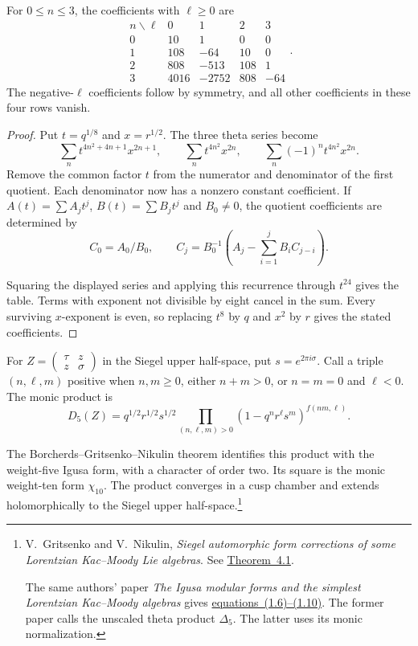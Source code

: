 \begin{proposition}\label{mht:prop:compact-jacobi-coefficients}
For \(0\leq n\leq3\), the coefficients with \(\ell\geq0\) are
\[
 \begin{array}{c|rrrr}
 n\backslash\ell&0&1&2&3\\ \hline
 0&10&1&0&0\\
 1&108&-64&10&0\\
 2&808&-513&108&1\\
 3&4016&-2752&808&-64
 \end{array}.
\]
The negative-\(\ell\) coefficients follow by symmetry, and all
other coefficients in these four rows vanish.
\end{proposition}
\begin{proof}
Put \(t=q^{1/8}\) and \(x=r^{1/2}\).
The three theta series become
\[
 \sum_n t^{4n^2+4n+1}x^{2n+1},\qquad
 \sum_n t^{4n^2}x^{2n},\qquad
 \sum_n(-1)^nt^{4n^2}x^{2n}.
\]
Remove the common factor \(t\) from the numerator and denominator
of the first quotient. Each denominator now has a nonzero constant
coefficient. If \(A(t)=\sum A_jt^j\), \(B(t)=\sum B_jt^j\)
and \(B_0\ne0\), the quotient coefficients are determined by
\[
 C_0=A_0/B_0,\qquad
 C_j=B_0^{-1}\left(A_j-\sum_{i=1}^jB_iC_{j-i}\right).
\]

Squaring the displayed series and applying this recurrence through
\(t^{24}\) gives the table. Terms with exponent not divisible by
eight cancel in the sum. Every surviving \(x\)-exponent is even,
so replacing \(t^8\) by \(q\) and \(x^2\) by \(r\) gives the stated
coefficients.
\end{proof}

For \(Z=\left(\begin{smallmatrix}\tau&z\\z&\sigma\end{smallmatrix}\right)\)
in the Siegel upper half-space, put \(s=e^{2\pi i\sigma}\).
Call a triple \((n,\ell,m)\) positive when \(n,m\geq0\),
either \(n+m>0\), or \(n=m=0\) and \(\ell<0\).
The monic product is
\begin{equation}\label{mht:eq:compact-igusa-product}
 D_5(Z)=q^{1/2}r^{1/2}s^{1/2}
       \prod_{(n,\ell,m)>0}
       (1-q^nr^\ell s^m)^{f(nm,\ell)}.
\end{equation}

The Borcherds--Gritsenko--Nikulin theorem identifies this product
with the weight-five Igusa form, with a character of order two.
Its square is the monic weight-ten form \(\chi_{10}\).
The product converges in a cusp chamber and extends holomorphically
to the Siegel upper half-space.\footnote{
V.~Gritsenko and V.~Nikulin,
\emph{Siegel automorphic form corrections of some Lorentzian
Kac--Moody Lie algebras}.
See \href{https://arxiv.org/abs/alg-geom/9504006}{Theorem~4.1}.

The same authors' paper
\emph{The Igusa modular forms and the simplest Lorentzian
Kac--Moody algebras} gives
\href{https://arxiv.org/abs/alg-geom/9603010}{equations~(1.6)--(1.10)}.
The former paper calls the unscaled theta product \(\Delta_5\).
The latter uses its monic normalization.}

